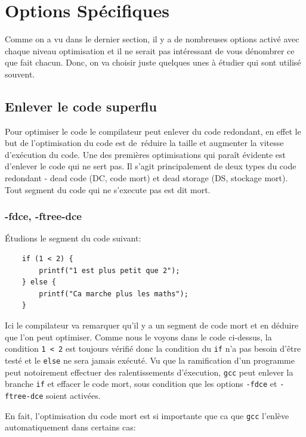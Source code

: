\documentclass[11pt]{article} %
\begin{document}
\section*{Options Sp\'ecifiques}
Comme on a vu dans le dernier section, il y a de nombreuses options activ\'e avec chaque niveau optimisation et il ne serait pas int\'eressant
de vous d\'enombrer ce que fait chacun. Donc, on va choisir juste quelques unes \`a \'etudier qui sont utilis\'e souvent.

\subsection*{Enlever le code superflu}
Pour optimiser le code le compilateur peut enlever du code redondant, en effet le but de l’optimisation du code est de réduire la taille et augmenter la vitesse d’exécution du code.
Une des premières optimisations qui paraît évidente est d’enlever le code qui ne sert pas. Il s'agit principalement de deux types du code redondant - dead code (DC, code mort) et dead storage (DS, stockage mort).
Tout segment du code qui ne s'execute pas est dit mort.


\subsubsection*{-fdce, -ftree-dce}

\'Etudions le segment du code suivant:
\begin{verbatim}
    if (1 < 2) {
        printf("1 est plus petit que 2");
    } else {
        printf("Ca marche plus les maths");
    }
\end{verbatim}

Ici le compilateur va remarquer qu'il y a un segment de code mort et en d\'eduire que l'on peut optimiser.
Comme nous le voyons dans le code ci-dessus, la condition \verb|1 < 2| est toujours v\'erifi\'e donc la condition du \verb|if| n’a pas
besoin d’être testé et le \verb|else| ne sera jamais exécuté. Vu que la ramification d'un programme peut notoirement effectuer des
ralentissements d'\'execution, \verb|gcc| peut enlever la branche \verb|if| et effacer le code mort, sous condition que les options \verb|-fdce| et
\verb|-ftree-dce| soient activ\'ees.

En fait, l'optimisation du code mort est si importante que ca que \verb|gcc| l'enl\`eve automatiquement dans certains cas:
\end{document}

